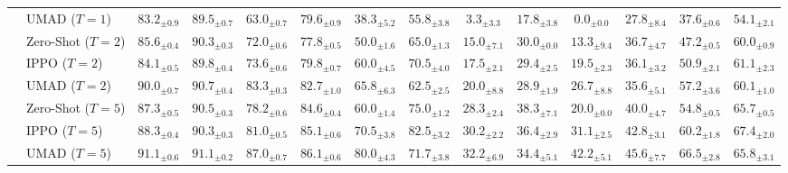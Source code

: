 \documentclass{article}
\newcommand{\bg}[2][0]{\cellcolor{MBlue!#1}#2}
\newcommand{\bged}[2][0]{\cellcolor{MPink!#1}#2}
\newcommand{\bgbase}[1]{\cellcolor{MGray!100}#1}
\newcommand{\sd}[2]{{#1}_{\pm#2}}
\newcommand{\sdb}[2]{\mathbf{#1}_{\pm#2}}
\theoremstyle{plain}
\theoremstyle{definition}
\theoremstyle{remark}
\begin{document}
\begin{table}[t]
{\begin{tabular}{l|l|cc|cc|cc|cc|cc|cc}
& UMAD ($T=1$) & \bg[10]{$\sd{83.2}{0.9}$} & \bged[10]{$\sd{89.5}{0.7}$} & \bged[10]{$\sd{63.0}{0.7}$} & \bg[35]{$\sd{79.6}{0.9}$} & \bg[10]{$\sd{38.3}{5.2}$} & \bged[15]{$\sd{55.8}{3.8}$} & \bged[10]{$\sd{3.3}{3.3}$} & \bged[10]{$\sd{17.8}{3.8}$} & \bged[25]{$\sd{0.0}{0.0}$} & \bged[10]{$\sd{27.8}{8.4}$} & \bged[10]{$\sd{37.6}{0.6}$} & \bged[10]{$\sd{54.1}{2.1}$} \\
\cmidrule(l{0pt}r{0pt}){2-14}
& \bgbase{Zero-Shot ($T=2$)} & \bgbase{$\sd{85.6}{0.4}$} & \bgbase{$\sd{90.3}{0.3}$} & \bgbase{$\sd{72.0}{0.6}$} & \bgbase{$\sd{77.8}{0.5}$} & \bgbase{$\sd{50.0}{1.6}$} & \bgbase{$\sd{65.0}{1.3}$} & \bgbase{$\sd{15.0}{7.1}$} & \bgbase{$\sd{30.0}{0.0}$} & \bgbase{$\sd{13.3}{9.4}$} & \bgbase{$\sd{36.7}{4.7}$} & \bgbase{$\sd{47.2}{0.5}$} & \bgbase{$\sd{60.0}{0.9}$}\\
& IPPO ($T=2$) & \bged[15]{$\sd{84.1}{0.5}$} & \bged[10]{$\sd{89.8}{0.4}$} & \bg[20]{$\sd{73.6}{0.6}$} & \bg[25]{$\sd{79.8}{0.7}$} & \bg[35]{$\sd{60.0}{4.5}$} & \bg[25]{$\sd{70.5}{4.0}$} & \bg[15]{$\sd{17.5}{2.1}$} & \bged[5]{$\sd{29.4}{2.5}$} & \bg[25]{$\sd{19.5}{2.3}$} & \bged[5]{$\sd{36.1}{3.2}$} & \bg[35]{$\sd{50.9}{2.1}$} & \bg[10]{$\sd{61.1}{2.3}$} \\
& UMAD ($T=2$) & \bg[35]{$\sd{90.0}{0.7}$} & \bg[10]{$\sd{90.7}{0.4}$} & \bg[55]{$\sd{83.3}{0.3}$} & \bg[45]{$\sd{82.7}{1.0}$} & \bg[45]{$\sd{65.8}{6.3}$} & \bged[15]{$\sd{62.5}{2.5}$} & \bg[20]{$\sd{20.0}{8.8}$} & \bged[5]{$\sd{28.9}{1.9}$} & \bg[40]{$\sd{26.7}{8.8}$} & \bged[5]{$\sd{35.6}{5.1}$} & \bg[60]{$\sd{57.2}{3.6}$} & \bg[5]{$\sd{60.1}{1.0}$}\\
\cmidrule(l{0pt}r{0pt}){2-14}
& \bgbase{Zero-Shot ($T=5$)} & \bgbase{$\sd{87.3}{0.5}$} & \bgbase{$\sd{90.5}{0.3}$} & \bgbase{$\sd{78.2}{0.6}$} & \bgbase{$\sd{84.6}{0.4}$} & \bgbase{$\sd{60.0}{1.4}$} & \bgbase{$\sd{75.0}{1.2}$} & \bgbase{$\sd{28.3}{2.4}$} & \bgbase{$\sdb{38.3}{7.1}$} & \bgbase{$\sd{20.0}{0.0}$} & \bgbase{$\sd{40.0}{4.7}$} & \bgbase{$\sd{54.8}{0.5}$} & \bgbase{$\sd{65.7}{0.5}$}\\
& IPPO ($T=5$) & \bg[15]{$\sd{88.3}{0.4}$} & \bged[5]{$\sd{90.3}{0.3}$} & \bg[25]{$\sd{81.0}{0.5}$} & \bg[10]{$\sd{85.1}{0.6}$} & \bg[40]{$\sd{70.5}{3.8}$} & \bg[25]{$\sdb{82.5}{3.2}$} & \bg[10]{$\sd{30.2}{2.2}$} & \bged[5]{$\sd{36.4}{2.9}$} & \bg[45]{$\sd{31.1}{2.5}$} & \bg[10]{$\sd{42.8}{3.1}$} & \bg[55]{$\sd{60.2}{1.8}$} & \bg[15]{$\sdb{67.4}{2.0}$} \\
& UMAD ($T=5$) & \bg[30]{$\sdb{91.1}{0.6}$} & \bg[15]{$\sdb{91.1}{0.2}$} & \bg[35]{$\sdb{87.0}{0.7}$} & \bg[15]{$\sdb{86.1}{0.6}$} & \bg[55]{$\sdb{80.0}{4.3}$} & \bged[15]{$\sd{71.7}{3.8}$} & \bg[15]{$\sdb{32.2}{6.9}$} & \bged[10]{$\sd{34.4}{5.1}$} & \bg[75]{$\sdb{42.2}{5.1}$} & \bg[20]{$\sdb{45.6}{7.7}$} & \bg[65]{$\sdb{66.5}{2.8}$} & \bg[5]{$\sd{65.8}{3.1}$}\\
\bottomrule
\end{tabular}
}
\end{table}
\end{document}
